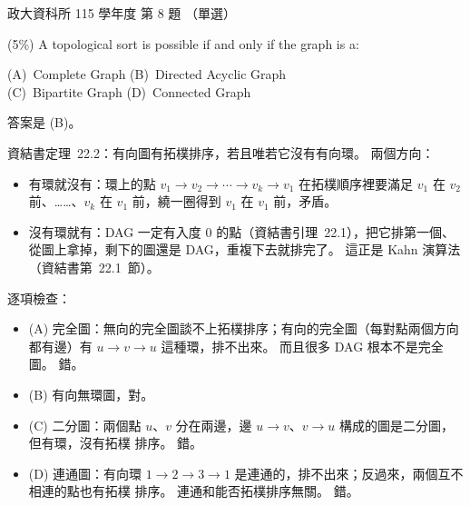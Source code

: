 \begin{pastexam}[label={px:nccu-115-dsa-08}]{政大資科所 115 學年度 第 8 題}
（單選）

(5\%) A topological sort is possible if and only if the graph is a:

(A)~Complete Graph \qquad (B)~Directed Acyclic Graph\\
(C)~Bipartite Graph \qquad (D)~Connected Graph
\end{pastexam}

\begin{pastsoln}
答案是 (B)。

資結書定理~22.2：有向圖有拓樸排序，若且唯若它沒有有向環。 兩個方向：
\begin{itemize}
\item 有環就沒有：環上的點 $v_1 \to v_2 \to \cdots \to v_k \to v_1$ 在拓樸順序裡要滿足
$v_1$ 在 $v_2$ 前、……、$v_k$ 在 $v_1$ 前，繞一圈得到 $v_1$ 在 $v_1$ 前，矛盾。
\item 沒有環就有：DAG 一定有入度 $0$ 的點（資結書引理~22.1），把它排第一個、從圖上拿掉，剩下的圖還是
DAG，重複下去就排完了。 這正是 Kahn 演算法（資結書第~22.1~節）。
\end{itemize}

逐項檢查：
\begin{itemize}
\item (A) 完全圖：無向的完全圖談不上拓樸排序；有向的完全圖（每對點兩個方向都有邊）有 $u \to v \to u$
這種環，排不出來。 而且很多 DAG 根本不是完全圖。 錯。
\item (B) 有向無環圖，對。
\item (C) 二分圖：兩個點 $u$、$v$ 分在兩邊，邊 $u \to v$、$v \to u$ 構成的圖是二分圖，但有環，沒有拓樸
排序。 錯。
\item (D) 連通圖：有向環 $1 \to 2 \to 3 \to 1$ 是連通的，排不出來；反過來，兩個互不相連的點也有拓樸
排序。 連通和能否拓樸排序無關。 錯。
\end{itemize}
\end{pastsoln}
